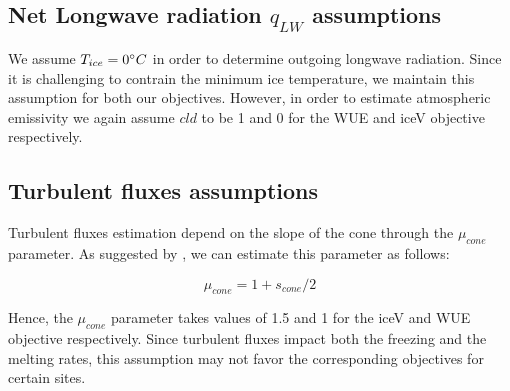 \documentclass[tc, manuscript]{copernicus}
\begin{document}
\subsection{Net Longwave radiation \texorpdfstring{$q_{LW}$}{Lg} assumptions} \label{sec:LW}

We assume $T_{ice} = 0 ^{\circ} C$ in order to determine outgoing longwave radiation. Since it is challenging to
contrain the minimum ice temperature, we maintain this assumption for both our objectives. However, in order to
estimate atmospheric emissivity we again assume $cld$ to be 1 and 0 for the WUE and iceV objective respectively.

\subsection{Turbulent fluxes assumptions} \label{sec:Qs}

Turbulent fluxes estimation depend on the slope of the cone through the $\mu_{cone}$ parameter. As suggested 
by \citet{oerlemansBriefCommunicationGrowth2021}, we can estimate this parameter as follows:

\begin{equation}
  \mu_{cone} =1 + s_{cone}/2
\end{equation}

Hence, the $\mu_{cone}$ parameter takes values of 1.5 and 1 for the iceV and WUE objective respectively.  Since
turbulent fluxes impact both the freezing and the melting rates, this assumption may not favor the corresponding
objectives for certain sites.

\noappendix       %



\end{document}
